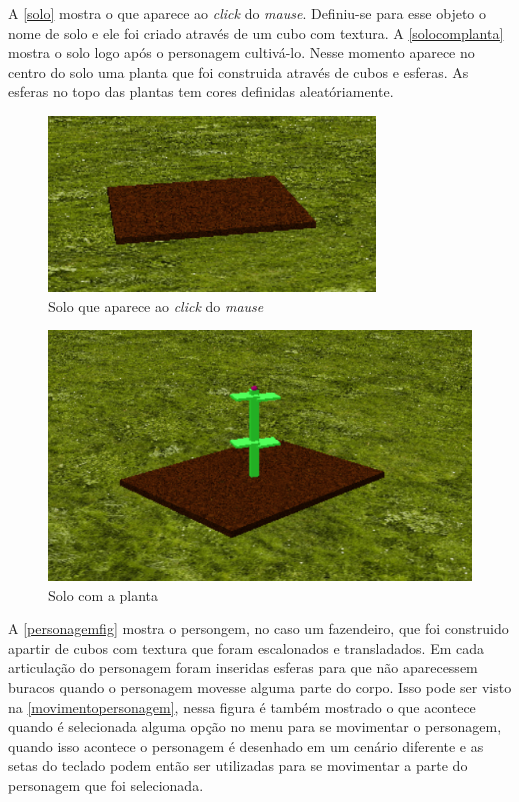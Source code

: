 \documentclass[
	12pt,				%
	openright,			%
	a4paper,			%
	english,			%
	french,				%
	spanish,			%
	brazil,				%
	]{abntex2}
\begin{document}
	A \autoref{solo} mostra o que aparece ao \emph{click} do \emph{mause}. Definiu-se para esse objeto o nome de solo e ele foi criado através de um cubo com textura. A \autoref{solocomplanta} mostra o solo logo após o personagem cultivá-lo. Nesse momento aparece no centro do solo uma planta que  foi construida através de cubos e esferas. As esferas no topo das plantas tem cores definidas aleatóriamente.
  
\begin{figure}[H]
\centering 
\caption{Solo que aparece ao \emph{click} do \emph{mause} } \label{solo}
\includegraphics[scale=1]{imagens/solo.png}
\end{figure}

\begin{figure}[H]
\centering 
\caption{Solo com a planta } \label{solocomplanta}
\includegraphics[scale=1]{imagens/solocomplanta.png}
\vspace{-1.5em}

\end{figure}




A \autoref{personagemfig} mostra o persongem, no caso um fazendeiro, que foi construido apartir de cubos com textura que foram escalonados e transladados. Em cada articulação do personagem foram inseridas esferas para que não aparecessem buracos quando o personagem movesse alguma parte do corpo. Isso pode ser visto na \autoref{movimentopersonagem}, nessa figura é também mostrado o que acontece quando é selecionada alguma opção no menu para se movimentar o personagem, quando isso acontece o personagem é desenhado em um cenário diferente e as setas do teclado podem então ser utilizadas para se movimentar a parte do personagem que foi selecionada.
\end{document}
